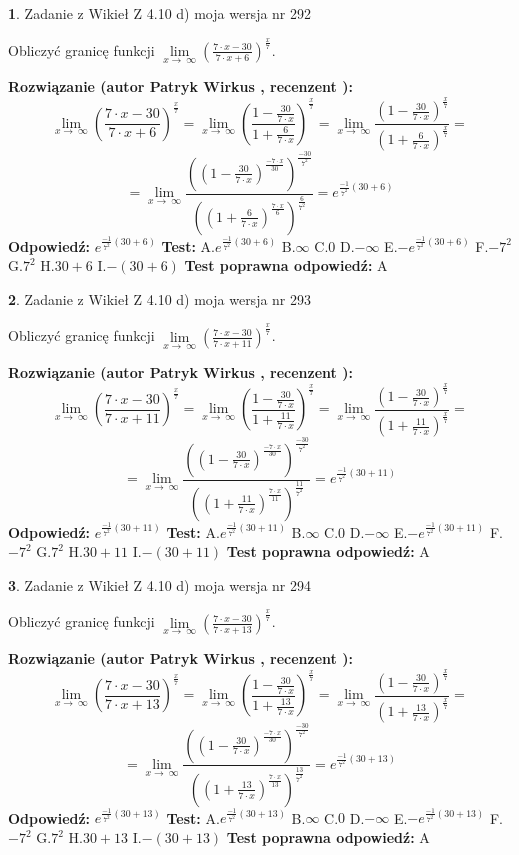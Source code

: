 \documentclass[12pt, a4paper]{article}
\theoremstyle{definition} %
\newtheorem{zad}{}
\newcommand{\zadStart}[1]{\begin{zad}#1\newline}
\newcommand{\zadStop}{\end{zad}}
\newcommand{\rozwStart}[2]{\noindent \textbf{Rozwiązanie (autor #1 , recenzent #2): }\newline}
\newcommand{\rozwStop}{\newline}
\newcommand{\odpStart}{\noindent \textbf{Odpowiedź:}\newline}
\newcommand{\odpStop}{\newline}
\newcommand{\testStart}{\noindent \textbf{Test:}\newline}
\newcommand{\testStop}{\newline}
\newcommand{\kluczStart}{\noindent \textbf{Test poprawna odpowiedź:}\newline}
\newcommand{\kluczStop}{\newline}
\begin{document}
\zadStart{Zadanie z Wikieł Z 4.10 d) moja wersja nr 292}


Obliczyć granicę funkcji  $\lim\limits_{x\to\ \infty}(\frac{7\cdot x-30}{7\cdot x+6})^{\frac{x}{7}}$.
\zadStop
\rozwStart{Patryk Wirkus}{}
$$\lim\limits_{x\to\ \infty}(\frac{7\cdot x-30}{7\cdot x+6})^{\frac{x}{7}} = \lim\limits_{x\to\ \infty}(\frac{1-\frac{30}{7\cdot x}}{1+\frac{6}{7\cdot x}})^{\frac{x}{7}}=\lim\limits_{x\to\ \infty}\frac{(1-\frac{30}{7\cdot x})^{\frac{x}{7}}}{(1+\frac{6}{7\cdot x})^{\frac{x}{7}}}=$$
$$=\lim\limits_{x\to\ \infty}\frac{((1-\frac{30}{7\cdot x})^{\frac{-7\cdot x}{30}})^{\frac{-30}{7^{2}}}}{((1+\frac{6}{7\cdot x})^{\frac{7\cdot x}{6}})^{\frac{6}{7^{2}}}}=e^{\frac{-1}{7^{2}}(30+6)}$$
\rozwStop
\odpStart
$e^{\frac{-1}{7^{2}}(30+6)}$
\odpStop
\testStart
A.$e^{\frac{-1}{7^{2}}(30+6)}$ B.$\infty$ C.$0$ D.$-\infty$ E.$-e^{\frac{-1}{7^{2}}(30+6)}$
F.$-7^{2}$ G.$7^{2}$
H.$30+6$
I.$-(30+6)$
\testStop
\kluczStart
A
\kluczStop



\zadStart{Zadanie z Wikieł Z 4.10 d) moja wersja nr 293}


Obliczyć granicę funkcji  $\lim\limits_{x\to\ \infty}(\frac{7\cdot x-30}{7\cdot x+11})^{\frac{x}{7}}$.
\zadStop
\rozwStart{Patryk Wirkus}{}
$$\lim\limits_{x\to\ \infty}(\frac{7\cdot x-30}{7\cdot x+11})^{\frac{x}{7}} = \lim\limits_{x\to\ \infty}(\frac{1-\frac{30}{7\cdot x}}{1+\frac{11}{7\cdot x}})^{\frac{x}{7}}=\lim\limits_{x\to\ \infty}\frac{(1-\frac{30}{7\cdot x})^{\frac{x}{7}}}{(1+\frac{11}{7\cdot x})^{\frac{x}{7}}}=$$
$$=\lim\limits_{x\to\ \infty}\frac{((1-\frac{30}{7\cdot x})^{\frac{-7\cdot x}{30}})^{\frac{-30}{7^{2}}}}{((1+\frac{11}{7\cdot x})^{\frac{7\cdot x}{11}})^{\frac{11}{7^{2}}}}=e^{\frac{-1}{7^{2}}(30+11)}$$
\rozwStop
\odpStart
$e^{\frac{-1}{7^{2}}(30+11)}$
\odpStop
\testStart
A.$e^{\frac{-1}{7^{2}}(30+11)}$ B.$\infty$ C.$0$ D.$-\infty$ E.$-e^{\frac{-1}{7^{2}}(30+11)}$
F.$-7^{2}$ G.$7^{2}$
H.$30+11$
I.$-(30+11)$
\testStop
\kluczStart
A
\kluczStop



\zadStart{Zadanie z Wikieł Z 4.10 d) moja wersja nr 294}


Obliczyć granicę funkcji  $\lim\limits_{x\to\ \infty}(\frac{7\cdot x-30}{7\cdot x+13})^{\frac{x}{7}}$.
\zadStop
\rozwStart{Patryk Wirkus}{}
$$\lim\limits_{x\to\ \infty}(\frac{7\cdot x-30}{7\cdot x+13})^{\frac{x}{7}} = \lim\limits_{x\to\ \infty}(\frac{1-\frac{30}{7\cdot x}}{1+\frac{13}{7\cdot x}})^{\frac{x}{7}}=\lim\limits_{x\to\ \infty}\frac{(1-\frac{30}{7\cdot x})^{\frac{x}{7}}}{(1+\frac{13}{7\cdot x})^{\frac{x}{7}}}=$$
$$=\lim\limits_{x\to\ \infty}\frac{((1-\frac{30}{7\cdot x})^{\frac{-7\cdot x}{30}})^{\frac{-30}{7^{2}}}}{((1+\frac{13}{7\cdot x})^{\frac{7\cdot x}{13}})^{\frac{13}{7^{2}}}}=e^{\frac{-1}{7^{2}}(30+13)}$$
\rozwStop
\odpStart
$e^{\frac{-1}{7^{2}}(30+13)}$
\odpStop
\testStart
A.$e^{\frac{-1}{7^{2}}(30+13)}$ B.$\infty$ C.$0$ D.$-\infty$ E.$-e^{\frac{-1}{7^{2}}(30+13)}$
F.$-7^{2}$ G.$7^{2}$
H.$30+13$
I.$-(30+13)$
\testStop
\kluczStart
A
\kluczStop
\end{document}
